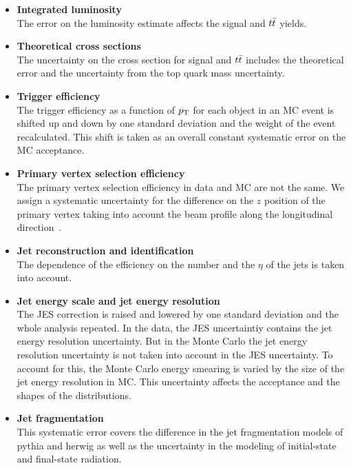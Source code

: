 \begin{itemize}
\item {\bf Integrated luminosity} \\ 
The error on the luminosity estimate affects the signal and $\mbox{$t\bar{t}$}$
yields.

\item {\bf Theoretical cross sections} \\ 
The uncertainty on the cross section for signal and $\mbox{$t\bar{t}$}$ includes
the theoretical error and the uncertainty from the top quark mass
uncertainty.

\item {\bf Trigger efficiency} \\
The trigger efficiency as a function of $\mbox{$p_{\rm T}$}$ for each object in an MC
event is shifted up and down by one standard deviation and the weight
of the event recalculated. This shift is taken as an overall constant
systematic error on the MC acceptance.

\item {\bf Primary vertex selection efficiency} \\
The primary vertex selection efficiency in data and MC are not the
same. We assign a systematic uncertainty for the difference on the $z$
position of the primary vertex taking into account the beam profile
along the longitudinal direction~\cite{beamshifts}.

\item {\bf Jet reconstruction and identification} \\
The dependence of the efficiency on the number and the $\eta$ of the
jets is taken into account.

\item {\bf Jet energy scale and jet energy resolution} \\
The JES correction is raised and lowered by one standard deviation and
the whole analysis repeated. In the data, the JES uncertaintiy
contains the jet energy resolution uncertainty. But in the Monte Carlo
the jet energy resolution uncertainty is not taken into account in the
JES uncertainty. To account for this, the Monte Carlo energy smearing
is varied by the size of the jet energy resolution in MC. This
uncertainty affects the acceptance and the shapes of the
distributions.

\item {\bf Jet fragmentation} \\
This systematic error covers the difference in the jet fragmentation
models of {\sc pythia} and {\sc herwig} as well as the uncertainty in
the modeling of initial-state and final-state radiation.


\end{itemize}
